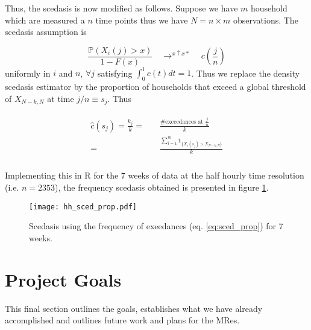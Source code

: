 \documentclass[a4paper]{article}
\begin{document}
Thus, the scedasis is now modified as follows. Suppose we have $m$ household which are measured a $n$ time points thus we have $N= n \times m$ observations. The scedasis assumption is

\begin{equation*}
\frac{\mathbb{P}(X_i(j)>x)}{1-F(x)} \quad  \displaystyle{ \mathop{\rightarrow}^{x \uparrow x*}} \quad c\left(\frac{j}{n}\right)
\end{equation*}
\noindent uniformly in $i$ and $n$, $\forall j$ satisfying $\int_0^1 c(t)dt = 1$. Thus we replace the density scedasis estimator by the proportion of households that exceed a global threshold of $X_{N-k,N}$ at time $j/n \equiv s_j$. Thus

\begin{align} \label{eq:sced_prop}
\begin{split}
\hat{c}(s_j) =  \frac{k_j}{k} =& \quad \frac{\# \text{exceedances at } \frac{j}{n}}{k} \\
= & \quad \frac{\sum_{i=1}^m \mathbb{1}_{\{X_i(s_j) > X_{N-k,N}\}}}{k}\\
\end{split}
\end{align}

Implementing this in R for the 7 weeks of data at the half hourly time resolution (i.e. $n = 2353$), the frequency scedasis obtained is presented in figure \ref{fig:hh_sced_prop}.

\begin{figure}
\centering
\texttt{[image: hh\_sced\_prop.pdf]}
\caption{\label{fig:hh_sced_prop} Scedasis using the frequency of exeedances (eq. \ref{eq:sced_prop}) for 7 weeks.}
\end{figure}



\clearpage
\section{Project Goals}
\label{sec:goals}
This final section outlines the goals, establishes what we have already accomplished and outlines future work and plans for the MRes.
\end{document}
